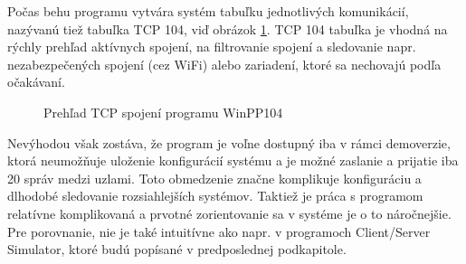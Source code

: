 \noindent Počas behu programu vytvára systém tabuľku jednotlivých komunikácií, nazývanú tiež tabuľka TCP 104, viď obrázok \ref{WinPP104-TCP}. TCP 104 tabuľka je vhodná na rýchly prehľad aktívnych spojení, na filtrovanie spojení a sledovanie napr. nezabezpečených spojení (cez WiFi) alebo zariadení, ktoré sa nechovajú podľa očakávaní. \par
\begin{figure}[h]
    \centering
    \caption{Prehľad TCP spojení programu WinPP104}
\label{WinPP104-TCP}
\end{figure}
\noindent Nevýhodou však zostáva, že program je voľne dostupný iba v rámci demoverzie, ktorá neumožňuje uloženie konfigurácií systému a je možné zaslanie a prijatie iba 20 správ medzi uzlami. Toto obmedzenie značne komplikuje konfiguráciu a dlhodobé sledovanie rozsiahlejších systémov. Taktiež je práca s programom relatívne komplikovaná a prvotné zorientovanie sa v systéme je o to náročnejšie. Pre porovnanie, nie je také intuitívne ako napr. v programoch Client/Server Simulator, ktoré budú popísané v predposlednej podkapitole.

